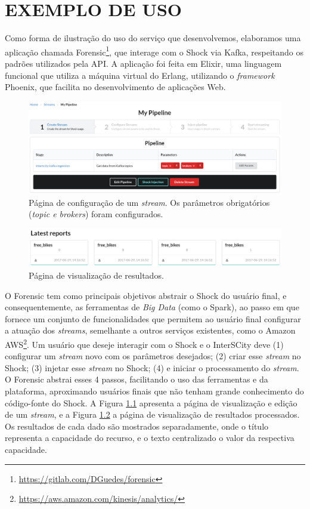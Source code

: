\chapter[EXEMPLO DE USO]{EXEMPLO DE USO}
\label{chapter:example}

Como forma de ilustração do uso do serviço que desenvolvemos, elaboramos uma
aplicação chamada
Forensic\footnote{\url{https://gitlab.com/DGuedes/forensic}}, que interage
com o Shock via Kafka, respeitando os padrões utilizados pela API. A aplicação
foi feita em Elixir, uma linguagem funcional que utiliza a máquina virtual do
Erlang, utilizando o \textit{framework} Phoenix, que facilita no desenvolvimento
de aplicações Web.

\begin{figure}[hbt]
  \centering
  \includegraphics[width=\textwidth]{figuras/pipeline.png}
    \caption{Página de configuração de um \textit{stream}. Os parâmetros
obrigatórios (\textit{topic e brokers}) foram configurados.}
  \label{fig:forensicparams}
\end{figure}

\begin{figure}[hbt]
  \centering
  \includegraphics[width=\textwidth]{figuras/latest-reports.png}
    \caption{Página de visualização de resultados.}
  \label{fig:reports}
\end{figure}

O Forensic tem como principais objetivos abstrair o Shock do usuário final,
e consequentemente, as ferramentas de \textit{Big Data} (como o Spark), ao passo em que
fornece um conjunto de funcionalidades que permitem ao usuário final configurar
a atuação dos \textit{streams}, semelhante a outros serviços existentes,
como o Amazon AWS\footnote{\url{https://aws.amazon.com/kinesis/analytics/}}.
Um usuário que deseje interagir com o Shock e o InterSCity deve
(1) configurar um \textit{stream} novo com os
parâmetros desejados; (2) criar esse \textit{stream} no Shock; (3) injetar
esse \textit{stream} no Shock; (4) e iniciar o processamento do
\textit{stream}. O Forensic abstrai esses 4 passos, facilitando o uso
das ferramentas e da plataforma, aproximando usuários finais que não tenham
grande conhecimento do código-fonte do Shock. A Figura \ref{fig:forensicparams}
apresenta a página de visualização e edição de um \textit{stream}, e a Figura
\ref{fig:reports} a página de visualização de resultados processados. Os
resultados de cada dado são mostrados separadamente, onde o título representa
a capacidade do recurso, e o texto centralizado o valor da respectiva capacidade.

